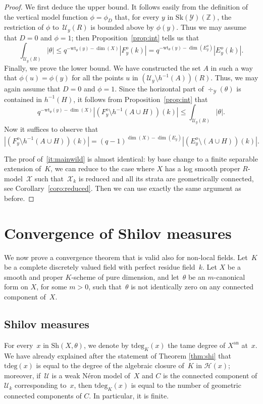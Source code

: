 \documentclass[JEP,XML,SOM,Unicode,NoFloatCountersInSection]{cedram}
\theoremstyle{definition}
\numberwithin{equation}{subsection}
\newcommand{\Z}{\ensuremath{\mathbb{Z}}}
\newcommand{\cX}{\ensuremath{\mathscr{X}}}
\newcommand{\cU}{\ensuremath{\mathscr{U}}}
\newcommand{\cY}{\ensuremath{\mathscr{Y}}}
\newcommand{\an}{\mathrm{an}}
\newcommand{\Sh}{\mathrm{Sh}}
\newcommand{\Sk}{\mathrm{Sk}}
\newcommand{\tdeg}{\mathrm{tdeg}}
\newcommand{\wt}{\mathrm{wt}}
\let\form\theta
\begin{document}
\begin{proof}
We first deduce the upper bound. It follows easily from the definition of the vertical model function $\phi=\phi_D$ that,
for every $y$ in $\Sk(\cY)(\Z)$, the restriction of $\phi$ to~$\cU_y(R)$ is bounded above by $\phi(y)$.
Thus we may assume that $D=0$ and $\phi=1$; then Proposition~\ref{prop:int} tells us that
\[
\int_{\cU_y(R)}|\form|\leq q^{-\wt_{\form}(y)-\dim(X)}|F^o_y(k)|= q^{-\wt_{\form}(y)-\dim(E^o_y)}|E^o_y(k)|.
\]
Finally, we prove the lower bound. We have constructed the set $A$ in such a way that $\phi(u)=\phi(y)$ for all the points
$u$ in $(\cU_y\setminus h^{-1}(A))(R)$. Thus, we may again assume that $D=0$ and $\phi=1$. Since the horizontal part of $\div_{\cY}(\form)$ is contained in $h^{-1}(H)$, it follows from Proposition~\ref{prop:int} that
\[
q^{-\wt_{\form}(y)-\dim(X)}|(F_y^o\setminus h^{-1}(A\cup H))(k)| \leq \int_{\cU_y(R)}|\form|.
\]
Now it suffices to observe that
\[
|(F_y^o\setminus h^{-1}(A\cup H))(k)|=(q-1)^{\dim(X)-\dim(E_y)}|(E_y^o\setminus (A\cup H))(k)|.
\]

The proof of~\eqref{it:mainwild} is almost identical: by base change to a finite separable extension of~$K$, we can reduce to the case where $X$ has a log smooth proper $R$\nobreakdash-model~$\cX$ such that~$\cX_k$ is reduced and all its strata are geometrically connected, see Corollary~\ref{coro:reduced}. Then we can use exactly the same argument as before.
\end{proof}

\section{Convergence of Shilov measures}\label{sec:convshilov}
We now prove a convergence theorem that is valid also for non-local fields.
Let~$K$ be a complete discretely valued field with perfect residue field~$k$.
Let $X$ be a smooth and proper $K$\nobreakdash-scheme of pure dimension, and let~$\form$ be an $m$-canonical form on $X$, for some $m>0$, such that~$\form$ is not identically zero on any connected component of~$X$.

\subsection{Shilov measures}\label{ss:shimeas}
For every~$x$ in $\Sh(X,\form)$, we denote by $\tdeg_K(x)$ the tame degree of $X^{\an}$ at~$x$.
We have already explained after the statement of Theorem \ref{thm:shi} that $\tdeg(x)$ is equal to the degree of the algebraic closure of~$K$ in $\mathscr{H}(x)$; moreover,
if~$\cU$ is a weak Néron model of~$X$ and $C$ is the connected component of $\cU_k$ corresponding to~$x$, then $\tdeg_K(x)$ is equal to the number of geometric connected components of $C$. In particular, it is finite.
\end{document}
